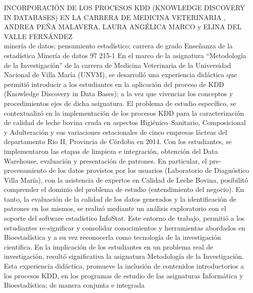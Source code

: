 \A
{INCORPORACIÓN DE LOS PROCESOS KDD (KNOWLEDGE DISCOVERY IN DATABASES) EN LA CARRERA DE MEDICINA VETERINARIA}
{, ANDREA PEÑA MALAVERA, LAURA ANGÉLICA MARCO y ELINA DEL VALLE FERNÁNDEZ}
{
\\}
{minería de datos; pensamiento estadístico; carrera de grado} 
 {Enseñanza de la estadística} 
 {Minería de datos} 
 {97} 
 {215-1}
{En el marco de la asignatura “Metodología de la Investigación” de la carrera de Medicina Veterinaria de la Universidad Nacional de Villa María (UNVM), se desarrolló una experiencia didáctica que permitió introducir a los estudiantes en la aplicación del proceso de KDD (Knowledge Discovery in Data Bases); a la vez que vivenciar los conceptos y procedimientos ejes de dicha asignatura. El problema de estudio específico, se contextualizó en la implementación de los procesos KDD para la caracterización de calidad de leche bovina cruda en aspectos Higiénico–Sanitario, Composicional y Adulteración y sus variaciones estacionales de cinco empresas lácteas del departamento Rio II, Provincia de Córdoba en 2014. Con los estudiantes, se implementaron las etapas de limpieza e integración, obtención del Data Warehouse, evaluación y presentación de patrones. En particular, el pre-procesamiento de los datos provistos por los usuarios (Laboratorio de Diagnóstico Villa María), con la asistencia de expertos en Calidad de Leche Bovina, posibilitó comprender el dominio del problema de estudio (entendimiento del negocio). En tanto, la evaluación de la calidad de los datos generados y la identificación de patrones en los mismos, se realizó mediante un análisis exploratorio con el soporte del software estadístico InfoStat. Este entorno de trabajo, permitió a los estudiantes re-significar y consolidar conocimientos y herramientas abordados en Bioestadística y a su vez reconocerla como tecnología de la investigación científica. En la implicación de los estudiantes en un problema real de investigación, resultó significativa la asignatura Metodología de la Investigación. Esta experiencia didáctica, promueve la inclusión de contenidos introductorios a los procesos KDD, en los programas de estudio de las asignaturas Informática y Bioestadística; de manera conjunta e integrada}
